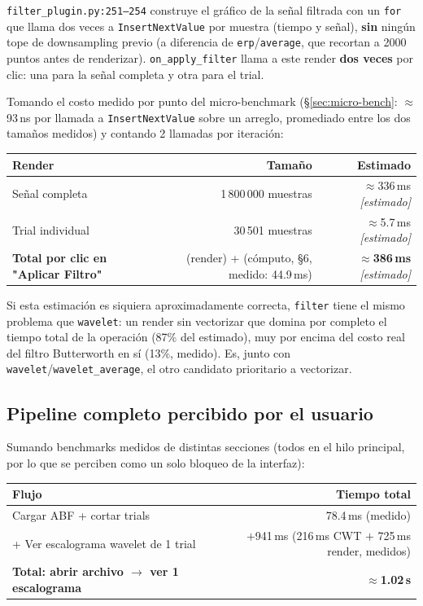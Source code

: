 \documentclass[11pt,a4paper]{article}
\newcommand{\estmark}{\textcolor{gris}{\textit{[estimado]}}}
\begin{document}
\texttt{filter\_\allowbreak plugin.py:251--254} construye el gráfico de la señal filtrada con un \texttt{for}
que llama dos veces a \texttt{InsertNextValue} por muestra (tiempo y señal), \textbf{sin} ningún tope de
downsampling previo (a diferencia de \texttt{erp}/\texttt{average}, que recortan a 2000 puntos antes de
renderizar). \texttt{on\_apply\_filter} llama a este render \textbf{dos veces} por clic: una para la señal
completa y otra para el trial.

Tomando el costo medido por punto del micro-benchmark
(\S\ref{sec:micro-bench}: $\approx$93\,ns por llamada a \texttt{InsertNextValue} sobre un arreglo, promediado
entre los dos tamaños medidos) y contando 2 llamadas por iteración:

\begin{center}
\begin{tabular}{lrr}
\toprule
\textbf{Render} & \textbf{Tamaño} & \textbf{Estimado} \\
\midrule
Señal completa & 1\,800\,000 muestras & $\approx$336\,ms \estmark \\
Trial individual & 30\,501 muestras & $\approx$5.7\,ms \estmark \\
\midrule
\textbf{Total por clic en "Aplicar Filtro"} & (render) + (cómputo, \S6, medido: 44.9\,ms) & \textbf{$\approx$386\,ms} \estmark \\
\bottomrule
\end{tabular}
\end{center}

Si esta estimación es siquiera aproximadamente correcta, \texttt{filter} tiene el mismo problema que
\texttt{wavelet}: un render sin vectorizar que domina por completo el tiempo total de la operación (87\% del
estimado), muy por encima del costo real del filtro Butterworth en sí (13\%, medido). Es, junto con
\texttt{wavelet}/\texttt{wavelet\_\allowbreak average}, el otro candidato prioritario a vectorizar.

\subsection{Pipeline completo percibido por el usuario}

Sumando benchmarks medidos de distintas secciones (todos en el hilo principal, por lo que se perciben como
un solo bloqueo de la interfaz):

\begin{center}
\begin{tabular}{lr}
\toprule
\textbf{Flujo} & \textbf{Tiempo total} \\
\midrule
Cargar ABF + cortar trials & 78.4\,ms (medido) \\
+ Ver escalograma wavelet de 1 trial & $+$941\,ms (216\,ms CWT $+$ 725\,ms render, medidos) \\
\midrule
\textbf{Total: abrir archivo $\to$ ver 1 escalograma} & \textbf{$\approx$1.02\,s} \\
\bottomrule
\end{tabular}
\end{center}
\end{document}
